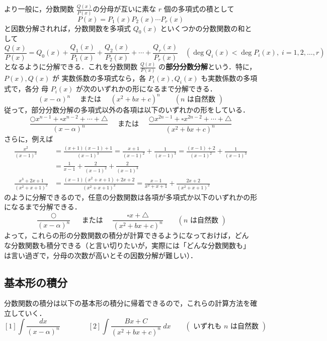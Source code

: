 \documentclass[10pt, uplatex, dvipdfmx]{jsarticle}
\theoremstyle{definition}
\numberwithin{equation}{section}
\newcommand{\ds}{\displaystyle}
\begin{document}
\newpage

より一般に，分数関数 $\ds \frac{Q(x)}{P(x)}$の分母が互いに素な $r$ 個の多項式の積として
\[
  P(x) = P_1(x)P_2(x) \cdots P_r(x)
\]
と因数分解されれば，分数関数を多項式 $Q_0(x)$ といくつかの分数関数の和として
\[
  \frac{Q(x)}{P(x)} = Q_0(x) + \frac{Q_1(x)}{P_1(x)} + \frac{Q_2(x)}{P_2(x)} +
  \cdots + \frac{Q_r(x)}{P_r(x)} \quad (\deg Q_i(x) < \deg P_i(x), \; i=1,2, \ldots, r)
\]
となるように分解できる．これを分数関数 $\ds
\frac{Q(x)}{P(x)}$ の\textbf{部分分数分解}という．特に，$P(x), Q(x)$ が
実数係数の多項式なら，各 $P_i(x), Q_i(x)$ も実数係数の多項式で，各分
母 $P_i(x)$ が次のいずれかの形になるまで分解できる．
\[
   (x-\alpha)^n \quad \text{ または } \quad (x^2+bx+c)^n \qquad (n \text{ は自然数 })
\]
従って，部分分数分解の多項式以外の各項は以下のいずれかの形をしている．
\[
  \frac{ \bigcirc x^{n-1} + \square x^{n-2} + \cdots + \triangle}{(x-\alpha)^n} \quad \text{ または } \quad
  \frac{\bigcirc x^{2n-1} + \square x^{2n-2} + \cdots + \triangle}{(x^2+bx+c)^n}
\]
さらに，例えば
\[
  \begin{aligned}
    \frac{x^2}{(x-1)^3}
    &= \frac{(x+1)(x-1)+1}{(x-1)^3} = \frac{x+1}{(x-1)^2} + \frac{1}{(x-1)^3}
      = \frac{(x-1)+2}{(x-1)^2} + \frac{1}{(x-1)^3} \\[1ex]
    &= \frac{1}{x-1} + \frac{2}{(x-1)^2} + \frac{2}{(x-1)^3}\\[5ex]
    \frac{x^3+2x+1}{(x^2+x+1)^2}
    &= \frac{(x-1)(x^2+x+1)+2x+2}{(x^2+x+1)^2} = \frac{x-1}{x^2+x+1} + \frac{2x+2}{(x^2+x+1)^2}
  \end{aligned}
\]
のように分解できるので，任意の分数関数は各項が多項式か以下のいずれかの形になるまで分解できる．
\begin{equation}\label{eq:basic-forms}
  \frac{\bigcirc}{(x-\alpha)^n} \quad \text{ または } \quad
  \frac{\square x + \bigtriangleup}{(x^2+bx+c)^n} \qquad (n \text{ は自然数 })
\end{equation}
よって，これらの形の分数関数の積分が計算できるようになっておけば，どん
な分数関数も積分できる（と言い切りたいが，実際には「どんな分数関数も」
は言い過ぎで，分母の次数が高いとその因数分解が難しい）．

\newpage

\subsection{基本形の積分}\label{subsec:basic}

分数関数の積分は以下の基本形の積分に帰着できるので，これらの計算方法を確立していく．
\[
  [1] \int\frac{dx}{(x-\alpha)^n} \qquad \qquad [2] \int \frac{Bx+C}{(x^2+bx+c)^n}\ dx \qquad
  ( \text{ いずれも $n$ は自然数 } )
\]
\end{document}
